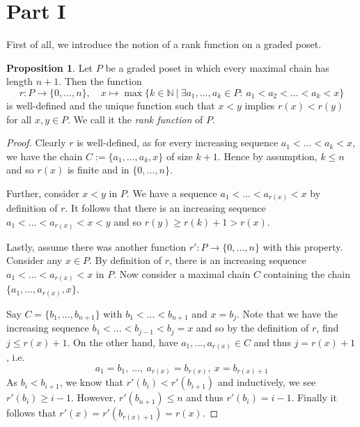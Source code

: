 \documentclass{scrartcl}
\newcommand{\N}{\mathbb{N}}
\theoremstyle{definition}
\newtheorem{proposition}[definition]{Proposition}
\begin{document}
\section{Part I}
First of all, we introduce the notion of a rank function on a graded poset.
\begin{proposition}
    \label{prop:definition_rank_function}
    Let $P$ be a graded poset in which every maximal chain has length $n + 1$. Then the function
    \begin{equation*}
        r: P \to \{ 0, ..., n \}, \quad x \mapsto \max\{ k \in \N \ | \ \exists a_1, ..., a_k \in P: \ a_1 < a_2 < ... < a_k < x \}
    \end{equation*}
    is well-defined and the unique function such that $x < y$ implies $r(x) < r(y)$ for all $x, y \in P$.
    We call it the \emph{rank function} of $P$.
\end{proposition}
\begin{proof}
    Clearly $r$ is well-defined, as for every increasing sequence $a_1 < ... < a_k < x$, we have the chain $C := \{ a_1, ..., a_k, x \}$ of size $k + 1$.
    Hence by assumption, $k \leq n$ and so $r(x)$ is finite and in $\{ 0, ..., n \}$.

    Further, consider $x < y$ in $P$.
    We have a sequence $a_1 < ... < a_{r(x)} < x$ by definition of $r$.
    It follows that there is an increasing sequence $a_1 < ... < a_{r(x)} < x < y$ and so $r(y) \geq r(k) + 1 > r(x)$.

    Lastly, assume there was another function $r': P \to \{ 0, ..., n \}$ with this property.
    Consider any $x \in P$.
    By definition of $r$, there is an increasing sequence $a_1 < ... < a_{r(x)} < x$ in $P$.
    Now consider a maximal chain $C$ containing the chain $\{ a_1, ..., a_{r(x)}, x \}$.

    Say $C = \{ b_1, ..., b_{n + 1} \}$ with $b_1 < ... < b_{n + 1}$ and $x = b_j$.
    Note that we have the increasing sequence $b_1 < ... < b_{j - 1} < b_j = x$ and so by the definition of $r$, find $j \leq r(x) + 1$.
    On the other hand, have $a_1, ..., a_{r(x)} \in C$ and thus $j = r(x) + 1$, i.e.
    \begin{equation*}
        a_1 = b_1, \ ..., \ a_{r(x)} = b_{r(x)}, \ x = b_{r(x) + 1}
    \end{equation*}
    As $b_i < b_{i + 1}$, we know that $r'(b_i) < r'(b_{i + 1})$ and inductively, we see $r'(b_i) \geq i - 1$.
    However, $r'(b_{n + 1}) \leq n$ and thus $r'(b_i) = i - 1$.
    Finally it follows that $r'(x) = r'(b_{r(x) + 1}) = r(x)$.
\end{proof}
\end{document}
